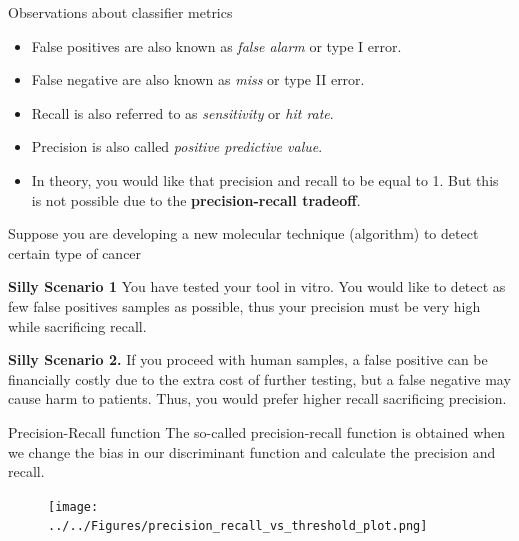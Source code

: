 \documentclass{beamer}
\begin{document}
\begin{frame}{Observations about classifier metrics}
	\begin{itemize}
		\item False positives are  also known as {\it false alarm} or type I error.
		\item False negative are also known as {\it miss} or type II error.
		\item Recall is also referred to as {\it sensitivity} or {\it hit rate}.
		\item Precision is also called {\it positive predictive value}.
		\item In theory, you would like that precision and recall to be equal to 1. But this is not possible due to the {\bf precision-recall tradeoff}. 
	\end{itemize}


Suppose you are developing a new molecular technique (algorithm) to detect certain type of cancer  

{\bf Silly Scenario 1 }
You have tested your tool in vitro. You would like to detect as few false positives samples as possible, thus your precision must be very high while sacrificing recall.

{\bf Silly Scenario 2.}
If you proceed with human samples, 
a false positive can be financially costly due to the extra cost of further testing, but a false negative may cause harm to patients. Thus,  you would prefer higher recall sacrificing precision.
\end{frame}

\begin{frame}{Precision-Recall function}
	The so-called precision-recall function is obtained when we change the bias in our discriminant function and calculate the precision and recall. 
\begin{figure}
	\centering
	\texttt{[image: ../../Figures/precision\_recall\_vs\_threshold\_plot.png]}
\end{figure}	
	
\end{frame}
\end{document}
